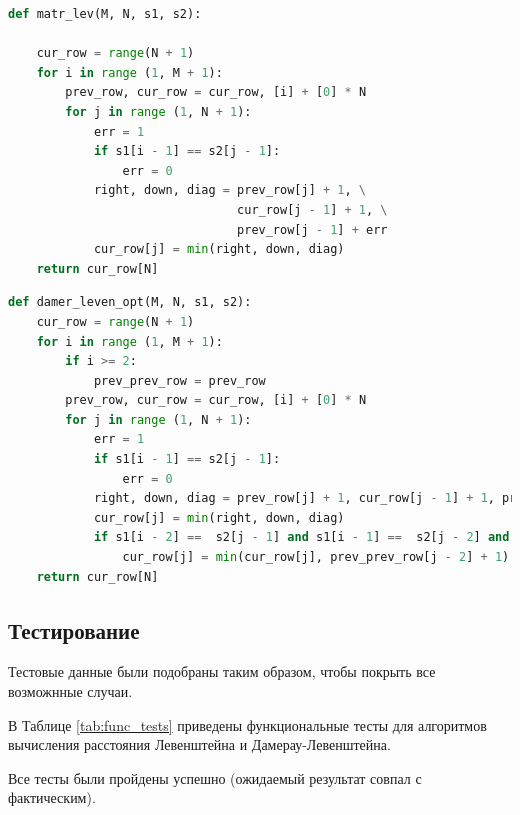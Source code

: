 \documentclass[14pt,russian]{scrartcl}
\begin{document}
\begin{lstlisting}[label=some-code,caption=Функция нахождения расстояния Левенштейна итеративно,language=Python]
def matr_lev(M, N, s1, s2):
    
    cur_row = range(N + 1)
    for i in range (1, M + 1):
        prev_row, cur_row = cur_row, [i] + [0] * N
        for j in range (1, N + 1):
            err = 1
            if s1[i - 1] == s2[j - 1]:
                err = 0
            right, down, diag = prev_row[j] + 1, \
                                cur_row[j - 1] + 1, \
                                prev_row[j - 1] + err
            cur_row[j] = min(right, down, diag)
    return cur_row[N]
\end{lstlisting}
\clearpage

\begin{lstlisting}[label=some-code,caption=Функция нахождения расстояния Дамерау-Левенштейна матрично,language=Python]
def damer_leven_opt(M, N, s1, s2):
    cur_row = range(N + 1)
    for i in range (1, M + 1):
        if i >= 2:
            prev_prev_row = prev_row 
        prev_row, cur_row = cur_row, [i] + [0] * N
        for j in range (1, N + 1):
            err = 1
            if s1[i - 1] == s2[j - 1]:
                err = 0
            right, down, diag = prev_row[j] + 1, cur_row[j - 1] + 1, prev_row[j - 1] + err
            cur_row[j] = min(right, down, diag)
            if s1[i - 2] ==  s2[j - 1] and s1[i - 1] ==  s2[j - 2] and i > 1 and j > 1:
                cur_row[j] = min(cur_row[j], prev_prev_row[j - 2] + 1)   
    return cur_row[N]
\end{lstlisting}

\clearpage

\subsection{Тестирование}

Тестовые данные были подобраны таким образом, чтобы покрыть все возможнные случаи.

В Таблице \ref{tab:func_tests} приведены функциональные тесты для алгоритмов вычисления расстояния Левенштейна и Дамерау-Левенштейна.

Все тесты были пройдены успешно (ожидаемый результат совпал с фактическим).
\end{document}
